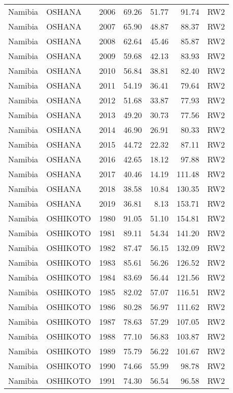 \begin{longtable}{lllrrrl}
  Namibia & OSHANA & 2006 & 69.26 & 51.77 & 91.74 & RW2 \\ 
  Namibia & OSHANA & 2007 & 65.90 & 48.87 & 88.37 & RW2 \\ 
  Namibia & OSHANA & 2008 & 62.64 & 45.46 & 85.87 & RW2 \\ 
  Namibia & OSHANA & 2009 & 59.68 & 42.13 & 83.93 & RW2 \\ 
  Namibia & OSHANA & 2010 & 56.84 & 38.81 & 82.40 & RW2 \\ 
  Namibia & OSHANA & 2011 & 54.19 & 36.41 & 79.64 & RW2 \\ 
  Namibia & OSHANA & 2012 & 51.68 & 33.87 & 77.93 & RW2 \\ 
  Namibia & OSHANA & 2013 & 49.20 & 30.73 & 77.56 & RW2 \\ 
  Namibia & OSHANA & 2014 & 46.90 & 26.91 & 80.33 & RW2 \\ 
  Namibia & OSHANA & 2015 & 44.72 & 22.32 & 87.11 & RW2 \\ 
  Namibia & OSHANA & 2016 & 42.65 & 18.12 & 97.88 & RW2 \\ 
  Namibia & OSHANA & 2017 & 40.46 & 14.19 & 111.48 & RW2 \\ 
  Namibia & OSHANA & 2018 & 38.58 & 10.84 & 130.35 & RW2 \\ 
  Namibia & OSHANA & 2019 & 36.81 & 8.13 & 153.71 & RW2 \\ 
  Namibia & OSHIKOTO & 1980 & 91.05 & 51.10 & 154.81 & RW2 \\ 
  Namibia & OSHIKOTO & 1981 & 89.11 & 54.34 & 141.20 & RW2 \\ 
  Namibia & OSHIKOTO & 1982 & 87.47 & 56.15 & 132.09 & RW2 \\ 
  Namibia & OSHIKOTO & 1983 & 85.61 & 56.26 & 126.52 & RW2 \\ 
  Namibia & OSHIKOTO & 1984 & 83.69 & 56.44 & 121.56 & RW2 \\ 
  Namibia & OSHIKOTO & 1985 & 82.02 & 57.07 & 116.51 & RW2 \\ 
  Namibia & OSHIKOTO & 1986 & 80.28 & 56.97 & 111.62 & RW2 \\ 
  Namibia & OSHIKOTO & 1987 & 78.63 & 57.29 & 107.05 & RW2 \\ 
  Namibia & OSHIKOTO & 1988 & 77.10 & 56.83 & 103.87 & RW2 \\ 
  Namibia & OSHIKOTO & 1989 & 75.79 & 56.22 & 101.67 & RW2 \\ 
  Namibia & OSHIKOTO & 1990 & 74.66 & 55.99 & 98.78 & RW2 \\ 
  Namibia & OSHIKOTO & 1991 & 74.30 & 56.54 & 96.58 & RW2 \\ 

\end{longtable}
